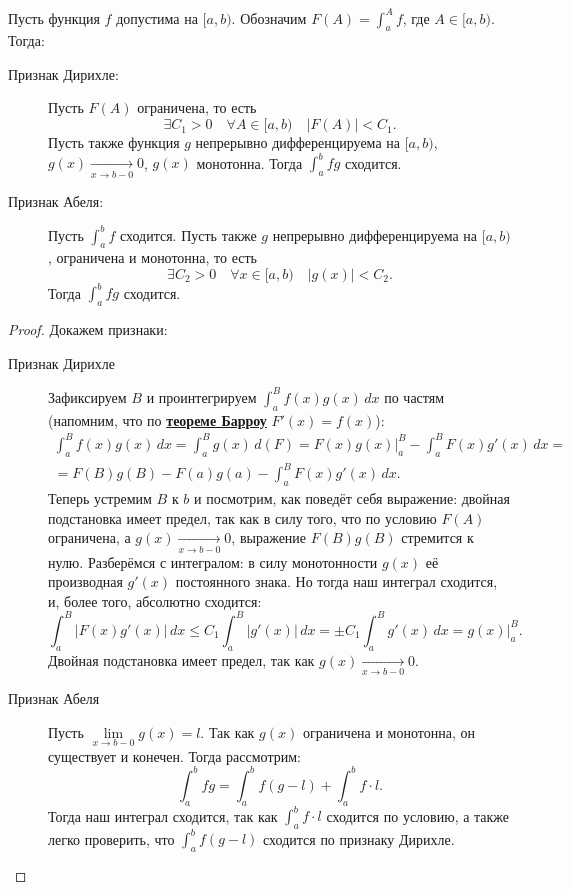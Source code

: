 \begin{theorem}
	Пусть функция \(f\) допустима на \([a, b)\). Обозначим \(F(A) = \int_a^A f\), где \(A \in [a, b)\). Тогда:
	\begin{description}
		\item[Признак Дирихле:] Пусть \(F(A)\) ограничена, то есть \[
			\exists C_1 > 0 \quad \forall A \in [a, b) \quad |F(A)| < C_1.
		\]
		Пусть также функция \(g\) непрерывно дифференцируема на \([a, b)\), \(g(x) \xrightarrow[x \to b-0]{} 0\), \(g(x)\) монотонна. Тогда \(\int_a^b fg\) сходится.
		\item[Признак Абеля:] Пусть \(\int_a^b f\) сходится. Пусть также \(g\) непрерывно дифференцируема на \([a, b)\), ограничена и монотонна, то есть \[
			\exists C_2 > 0 \quad \forall x \in [a, b) \quad |g(x)| < C_2.
		\]
		Тогда \(\int_a^b fg\) сходится. 
	\end{description} 
\end{theorem}
\begin{proof}
	Докажем признаки:
	\begin{description}
		\item[Признак Дирихле] Зафиксируем \(B\) и проинтегрируем \(\displaystyle \int_a^B f(x)g(x) \, dx\) по частям (напомним, что по \hyperlink{t8}{\bfseries теореме Барроу} \(F'(x) = f(x)\)):
		\begin{multline*}
			\int_a^B f(x)g(x) \, dx = \int_a^B g(x) \, d(F) = F(x)g(x) \bigg|_a^B -\int_a^B F(x)g'(x) \, dx = \\
			= F(B)g(B) - F(a)g(a) - \int_a^B F(x)g'(x) \, dx.
		\end{multline*}
		Теперь устремим \(B\) к \(b\) и посмотрим, как поведёт себя выражение: двойная подстановка имеет предел, так как в силу того, что по условию \(F(A)\) ограничена, а \(g(x) \xrightarrow[x \to b-0]{} 0\), выражение \(F(B)g(B)\) стремится к нулю. Разберёмся с интегралом: в силу монотонности \(g(x)\) её производная \(g'(x)\) постоянного знака. Но тогда наш интеграл сходится, и, более того, абсолютно сходится: \[
			\int_a^B |F(x)g'(x)| \, dx \leqslant C_1 \int_a^B |g'(x)| \, dx = \pm C_1 \int_a^B g'(x) \, dx = g(x) \bigg|_a^B.
		\]
		Двойная подстановка имеет предел, так как \(g(x) \xrightarrow[x \to b-0]{} 0\).
		\item[Признак Абеля] Пусть \(\lim\limits_{x \to b-0} g(x) = l\). Так как \(g(x)\) ограничена и монотонна, он существует и конечен. Тогда рассмотрим: \[
			\int_a^b fg = \int_a^b f(g - l) + \int_a^b f \cdot l.
		\]
		Тогда наш интеграл сходится, так как \(\int_a^b f \cdot l\) сходится по условию, а также легко проверить, что \(\int_a^b f(g - l)\) сходится по признаку Дирихле.
	\end{description}
\end{proof}

